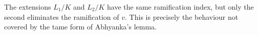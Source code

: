 \begin{example}
    The extensions $L_1/K$ and $L_2/K$ have the same ramification index, but only the second eliminates the ramification of $v$.
    This is precisely the behaviour not covered by the tame form of Abhyanka's lemma.
\end{example}

